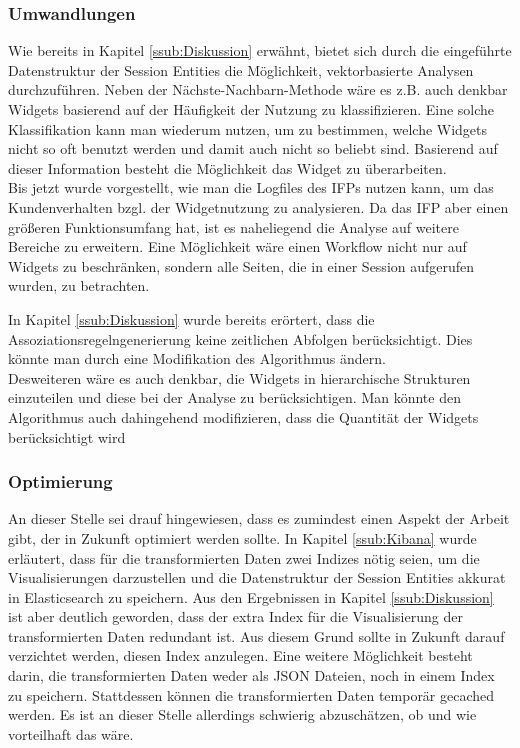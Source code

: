 \subsubsection{Umwandlungen}
\label{ssub:Umwandlungen}

Wie bereits in Kapitel \ref{ssub:Diskussion} erwähnt, bietet sich durch die eingeführte Datenstruktur der Session Entities die Möglichkeit, vektorbasierte Analysen durchzuführen. Neben der Nächste-Nachbarn-Methode wäre es z.B. auch denkbar Widgets basierend auf der Häufigkeit der Nutzung zu klassifizieren. Eine solche Klassifikation kann man wiederum nutzen, um zu bestimmen, welche Widgets nicht so oft benutzt werden und damit auch nicht so beliebt sind. Basierend auf dieser Information besteht die Möglichkeit das Widget zu überarbeiten.\\

Bis jetzt wurde vorgestellt, wie man die Logfiles des IFPs nutzen kann, um das Kundenverhalten bzgl. der Widgetnutzung zu analysieren. Da das IFP aber einen größeren Funktionsumfang hat, ist es naheliegend die Analyse auf weitere Bereiche zu erweitern. Eine Möglichkeit wäre einen Workflow nicht nur auf Widgets zu beschränken, sondern alle Seiten, die in einer Session aufgerufen wurden, zu betrachten.

In Kapitel \ref{ssub:Diskussion} wurde bereits erörtert, dass die Assoziationsregelngenerierung keine zeitlichen Abfolgen berücksichtigt. Dies könnte man durch eine Modifikation des Algorithmus ändern. \citep{Be03}\\
Desweiteren wäre es auch denkbar, die Widgets in hierarchische Strukturen einzuteilen und diese bei der Analyse zu berücksichtigen. Man könnte den Algorithmus auch dahingehend modifizieren, dass die Quantität der Widgets berücksichtigt wird \citep{EsSa00}\\
\subsubsection{Optimierung}
\label{ssub:Optimierung}
An dieser Stelle sei drauf hingewiesen, dass es zumindest einen Aspekt der Arbeit gibt, der in Zukunft optimiert werden sollte. In Kapitel \ref{ssub:Kibana} wurde erläutert, dass für die transformierten Daten zwei Indizes nötig seien, um die Visualisierungen darzustellen und die Datenstruktur der Session Entities akkurat in Elasticsearch zu speichern. Aus den Ergebnissen in Kapitel \ref{ssub:Diskussion} ist aber deutlich geworden, dass der extra Index für die Visualisierung der transformierten Daten redundant ist. Aus diesem Grund sollte in Zukunft darauf verzichtet werden, diesen Index anzulegen. Eine weitere Möglichkeit besteht darin, die transformierten Daten weder als JSON Dateien, noch in einem Index zu speichern. Stattdessen können die transformierten Daten temporär gecached werden. Es ist an dieser Stelle allerdings schwierig abzuschätzen, ob und wie vorteilhaft das wäre.

